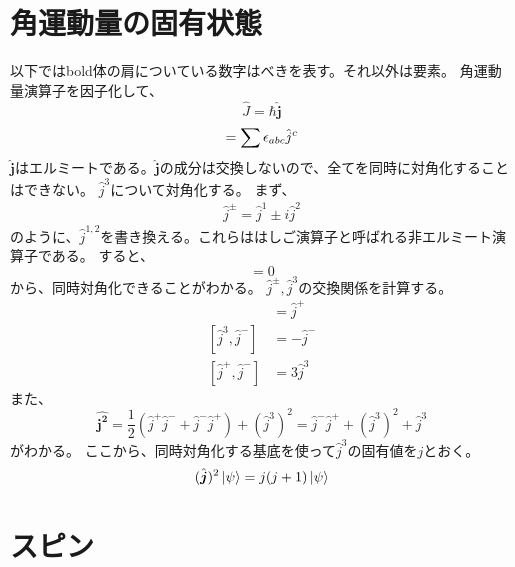 \documentclass{jsarticle}
\newcommand{\half}{\frac{1}{2}}
\newcommand{\beq}{\begin{equation}}
\newcommand{\eeq}{\end{equation}}
\newcommand{\hj}{\hat{j}}
\newcommand{\hjm}{\hat{j}^{-}}
\newcommand{\hjp}{\hat{j}^{+}}
\newcommand{\hbj}{\hat{\bm{j}}}
\newcommand{\hbjt}{\hat{\bm{j^2}}}
\newcommand{\hcj}{\hat{J}}
\begin{document}
\section{角運動量の固有状態}
以下ではbold体の肩についている数字はべきを表す。それ以外は要素。
角運動量演算子を因子化して、
\beq
    \hcj = \hbar \hbj
\eeq
\beq
[\hj^a,\hj^b] = \sum \epsilon_{abc}\hj^c\\
\eeq
$\hbj$はエルミートである。$\hbj$の成分は交換しないので、全てを同時に対角化することはできない。
$\hj^3$について対角化する。
まず、
\begin{align}
    \hj^{\pm} = \hj^1 \pm i \hj^2
\end{align}
のように、$\hj^{1,2}$を書き換える。これらははしご演算子と呼ばれる非エルミート演算子である。
すると、
\beq
[\hbjt,\hj^3] = 0
\eeq
から、同時対角化できることがわかる。
$\hj^{\pm},\hj^3$の交換関係を計算する。
\begin{align}
    [\hj^3, \hj^{+}] &= \hj^{+}\\
[\hj^3, \hj^{-}] &= -\hj^{-}\\
[\hj^{+}, \hj^{-}] &= 3\hj^{3}
\end{align}
また、
\beq
\hbjt = \half (\hjp\hjm + \hjm\hjp) + (\hj^3)^2 =  \hjm\hjp + (\hj^3)^2 + \hj^3
\eeq
がわかる。
ここから、同時対角化する基底を使って$\hj^3$の固有値を$j$とおく。
\beq
    (\hbj)^2 \ket{\psi} = j(j+1)\ket{\psi}
\eeq
\section{スピン}
\end{document}
